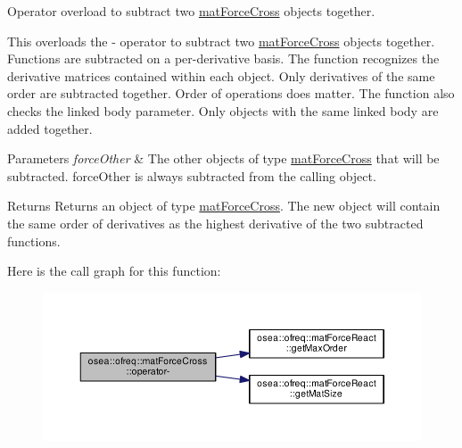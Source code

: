 Operator overload to subtract two \hyperlink{classosea_1_1ofreq_1_1mat_force_cross}{mat\-Force\-Cross} objects together. 

This overloads the -\/ operator to subtract two \hyperlink{classosea_1_1ofreq_1_1mat_force_cross}{mat\-Force\-Cross} objects together. Functions are subtracted on a per-\/derivative basis. The function recognizes the derivative matrices contained within each object. Only derivatives of the same order are subtracted together. Order of operations does matter. The function also checks the linked body parameter. Only objects with the same linked body are added together. 
\begin{DoxyParams}{Parameters}
{\em force\-Other} & The other objects of type \hyperlink{classosea_1_1ofreq_1_1mat_force_cross}{mat\-Force\-Cross} that will be subtracted. force\-Other is always subtracted from the calling object. \\
\hline
\end{DoxyParams}
\begin{DoxyReturn}{Returns}
Returns an object of type \hyperlink{classosea_1_1ofreq_1_1mat_force_cross}{mat\-Force\-Cross}. The new object will contain the same order of derivatives as the highest derivative of the two subtracted functions. 
\end{DoxyReturn}


Here is the call graph for this function\-:
\nopagebreak
\begin{figure}[H]
\begin{center}
\leavevmode
\includegraphics[width=350pt]{classosea_1_1ofreq_1_1mat_force_cross_af22b49c1536dc753f99b34a3eba1c8e7_cgraph}
\end{center}
\end{figure}


